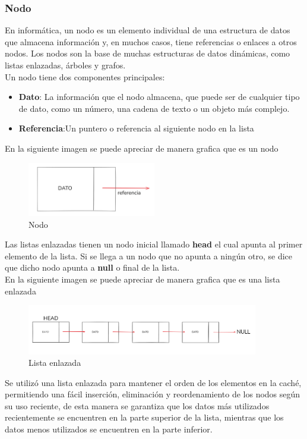         \subsubsection{Nodo}
        En informática, un nodo es un elemento individual de una estructura de datos que almacena información y, en muchos casos, tiene referencias o enlaces a otros nodos. 
        Los nodos son la base de muchas estructuras de datos dinámicas, como listas enlazadas, árboles y grafos.\\
        Un nodo tiene dos componentes principales:
        \begin{itemize}
            \item  \textbf{Dato}: La información que el nodo almacena, que puede ser de cualquier tipo de dato, como un número, una cadena de texto o un objeto más complejo.
            \item  \textbf{Referencia}:Un puntero o referencia al siguiente nodo en la lista
        \end{itemize}
        En la siguiente imagen se puede apreciar de manera grafica que es un nodo
        \begin{figure}[H]
            \centering %
            \includegraphics[width=0.5\textwidth]{./src/images/Nodo.png} 
            \caption{Nodo} 
            \label{fig: nodo} 
        \end{figure}
    Las listas enlazadas tienen un nodo inicial llamado \textbf{head} el cual apunta al primer elemento de la lista. Si se llega a un nodo que no apunta a ningún otro, 
    se dice que dicho nodo apunta a \textbf{null} o final de la lista.\\
    En la siguiente imagen se puede apreciar de manera grafica que es una lista enlazada
    \begin{figure}[H]
        \centering %
        \includegraphics[width=0.9\textwidth]{./src/images/ListaEnlazada.png} 
        \caption{Lista enlazada} 
        \label{fig: lista} 
    \end{figure}
    Se utilizó una lista enlazada para mantener el orden de los elementos en la caché, permitiendo una fácil inserción, eliminación y reordenamiento de los nodos 
    según su uso reciente, de esta manera se garantiza que los datos más utilizados recientemente se encuentren en la parte superior de la lista, mientras que los 
    datos menos utilizados se encuentren en la parte inferior.
